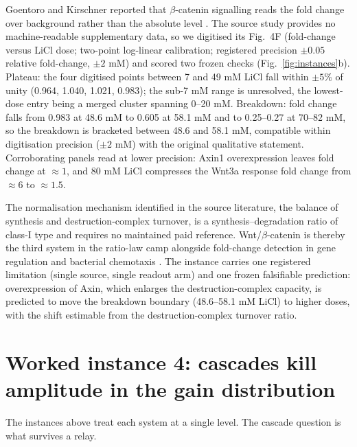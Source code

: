 \documentclass[11pt,a4paper]{article}
\begin{document}
Goentoro and Kirschner reported that $\beta$-catenin signalling reads the fold change over background rather than the absolute level \cite{Goentoro2009Wnt}. The source study provides no machine-readable supplementary data, so we digitised its Fig.\ 4F (fold-change versus LiCl dose; two-point log-linear calibration; registered precision $\pm0.05$ relative fold-change, $\pm2$ mM) and scored two frozen checks (Fig.~\ref{fig:instances}b). Plateau: the four digitised points between 7 and 49 mM LiCl fall within $\pm5\%$ of unity (0.964, 1.040, 1.021, 0.983); the sub-7 mM range is unresolved, the lowest-dose entry being a merged cluster spanning 0--20 mM. Breakdown: fold change falls from 0.983 at 48.6 mM to 0.605 at 58.1 mM and to 0.25--0.27 at 70--82 mM, so the breakdown is bracketed between 48.6 and 58.1 mM, compatible within digitisation precision ($\pm2$ mM) with the original qualitative statement. Corroborating panels read at lower precision: Axin1 overexpression leaves fold change at $\approx1$, and 80 mM LiCl compresses the Wnt3a response fold change from $\approx6$ to $\approx1.5$.

The normalisation mechanism identified in the source literature, the balance of synthesis and destruction-complex turnover, is a synthesis--degradation ratio of class-I type and requires no maintained paid reference. Wnt/$\beta$-catenin is thereby the third system in the ratio-law camp alongside fold-change detection in gene regulation \cite{Goentoro2009iFFL,Shoval2010,Adler2018} and bacterial chemotaxis \cite{Lazova2011,Shimizu2010}. The instance carries one registered limitation (single source, single readout arm) and one frozen falsifiable prediction: overexpression of Axin, which enlarges the destruction-complex capacity, is predicted to move the breakdown boundary (48.6--58.1 mM LiCl) to higher doses, with the shift estimable from the destruction-complex turnover ratio.

\section{Worked instance 4: cascades kill amplitude in the gain distribution}
\label{sec:cascade}

The instances above treat each system at a single level. The cascade question is what survives a relay.
\end{document}
